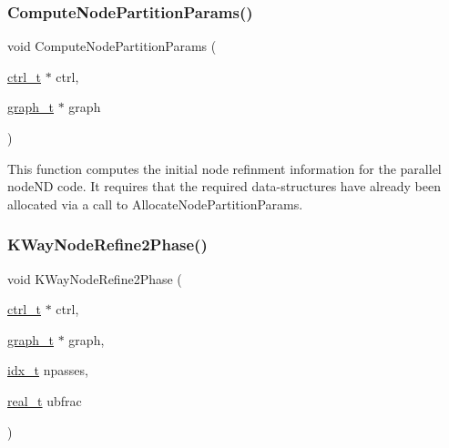 \subsubsection{\texorpdfstring{Compute\+Node\+Partition\+Params()}{ComputeNodePartitionParams()}}
{\footnotesize\ttfamily void Compute\+Node\+Partition\+Params (\begin{DoxyParamCaption}\item[{\hyperlink{a00742}{ctrl\+\_\+t} $\ast$}]{ctrl,  }\item[{\hyperlink{a00734}{graph\+\_\+t} $\ast$}]{graph }\end{DoxyParamCaption})}

This function computes the initial node refinment information for the parallel node\+ND code. It requires that the required data-\/structures have already been allocated via a call to Allocate\+Node\+Partition\+Params. \mbox{\label{a00383_a5c42d043dc7f9e6d0b955a4d004a7470}} 
\subsubsection{\texorpdfstring{K\+Way\+Node\+Refine2\+Phase()}{KWayNodeRefine2Phase()}}
{\footnotesize\ttfamily void K\+Way\+Node\+Refine2\+Phase (\begin{DoxyParamCaption}\item[{\hyperlink{a00742}{ctrl\+\_\+t} $\ast$}]{ctrl,  }\item[{\hyperlink{a00734}{graph\+\_\+t} $\ast$}]{graph,  }\item[{\hyperlink{a00876_aaa5262be3e700770163401acb0150f52}{idx\+\_\+t}}]{npasses,  }\item[{\hyperlink{a00876_a1924a4f6907cc3833213aba1f07fcbe9}{real\+\_\+t}}]{ubfrac }\end{DoxyParamCaption})}


